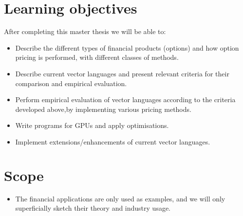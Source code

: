 \documentclass[10pt,a4paper,final,oneside,openany,article]{memoir}
\begin{document}
\chapter{Learning objectives}
After completing this master thesis we will be able to:
\begin{itemize}
\item Describe the different types of financial products (options) and
  how option pricing is performed, with different classes of methods.
\item Describe current vector languages and present relevant criteria
  for their comparison and empirical evaluation.
\item Perform empirical evaluation of vector languages according to
  the criteria developed above,by implementing various pricing
  methods.
\item Write programs for GPUs and apply optimisations.
\item Implement extensions/enhancements of current vector languages.
\end{itemize}

\chapter{Scope}
\begin{itemize}
\item The financial applications are only used as examples, and we
  will only superficially sketch their theory and industry usage.
\end{itemize}

{} 
\printbibliography

\end{document}
